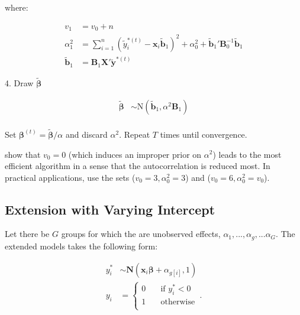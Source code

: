 \documentclass[11pt,a4paper]{article}
\begin{document}
\begin{shadedbox}
where: 

\begin{equation*}
\begin{split}
v_1 &= v_0 + n \\
\alpha_1^2 &= \sum_{i=1}^n (\tilde{y}_i^{*(t)} - \mathbf{x}_i\mathbf{\tilde{b}}_1)^2 + \alpha_0^2 + \mathbf{\tilde{b}}_1'\mathbf{B}^{-1}_0 \mathbf{\tilde{b}}_1 \\
\mathbf{\tilde{b}}_1 &= \mathbf{B}_1 \mathbf{X}' \tilde{\mathbf{y}}^{*(t)}
\end{split}	
\end{equation*}


4. Draw $\bm{\tilde{\beta}}$

\begin{equation*}
\begin{split}
	\bm{\tilde{\beta}} &\sim \mathrm{N}(\mathbf{\tilde{b}}_1, \alpha^2 \mathbf{B}_1 ) \\
\end{split}
\end{equation*}

Set $\bm{\beta}^{(t)} = \bm{\tilde{\beta}} / \alpha$ and discard $\alpha^2$. Repeat $T$ times until convergence. 
\end{shadedbox}

\citet{vanDyk.Meng.2001} show that $v_0=0$ (which induces an improper prior on $\alpha^2$) leads to the most efficient algorithm in a sense that the autocorrelation is reduced most. In practical applications, \citet{Imai.vanDyk.2005} use the sets ($v_0=3,\alpha_0^2=3$) and ($v_0=6,\alpha_0^2=v_0$). 


\subsection*{Extension with Varying Intercept}

Let there be $G$ groups for which the are unobserved effects, $\alpha_1,...,\alpha_g,...\alpha_G$. The extended models takes the following form: 

\begin{equation}
\begin{split}
y^{*}_i &\sim \mathrm{\mathbf{N}}(\textbf{x}_i \boldsymbol{\beta} + \alpha_{g[i]},1) \\
y_{i} &= \left \{
\begin{array}{ll}
	0 & \quad \text{if $y_{i}^{*} < 0$ }\\
	1 & \quad \text{otherwise}\\
\end{array} \right..
\end{split}	
\end{equation}
\end{document}
